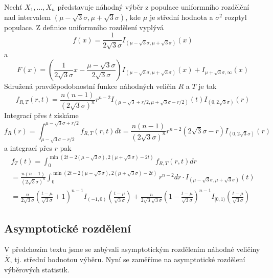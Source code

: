 \begin{example}
Nechť $X_1, ..., X_n$ představuje náhodný výběr z populace uniformního rozdělění nad intervalem $(\mu - \sqrt{3}\sigma, \mu + \sqrt{3}\sigma)$, kde $\mu$ je střední hodnota a $\sigma^2$ rozptyl populace. Z definice uniformního rozdělení vyplývá
\begin{equation*}
f(x) = \frac{1}{2 \sqrt{3} \sigma} I_{(\mu - \sqrt{3}\sigma, \mu + \sqrt{3}\sigma)}(x)
\end{equation*}
a
\begin{equation*}
F(x) = \left(\frac{1}{2 \sqrt{3} \sigma}x - \frac{\mu - \sqrt{3} \sigma}{2 \sqrt{3} \sigma} \right) I_{(\mu - \sqrt{3}\sigma, \mu + \sqrt{3}\sigma)}(x) + I_{\mu + \sqrt{3}\sigma, \infty}(x)
\end{equation*}
Sdružená pravděpodobnostní funkce náhodných veličin $R$ a $T$ je tak
\begin{equation*}
f_{R, T}(r, t) = \frac{n(n - 1)}{(2 \sqrt{3} \sigma)^n} r^{n - 2} I_{(\mu - \sqrt{3} + r/2, \mu + \sqrt{3}\sigma - r/2)}(t)I_{(0, 2 \sqrt{3} \sigma)}(r)
\end{equation*}
Integrací přes $t$ získáme
\begin{equation*}
f_R(r) = \int_{\mu - \sqrt{3} \sigma - r/2}^{\mu - \sqrt{3} \sigma + r/2}f_{R,T}(r,t)dt = \frac{n(n - 1)}{(2 \sqrt{3} \sigma)^n}r^{n - 2}(2 \sqrt{3}\sigma - r)I_{(0, 2 \sqrt{3}\sigma)}(r)
\end{equation*}
a integrací přes $r$ pak
\begin{gather*}
f_T(t) = \int_0^{\min(2t - 2(\mu - \sqrt{3}\sigma), 2(\mu + \sqrt{3}\sigma) - 2t)}f_{R,T}(r,t)dr\\
= \frac{n(n - 1)}{(2 \sqrt{3} \sigma)^n} \int_0^{\min(2t - 2(\mu - \sqrt{3}\sigma), 2(\mu + \sqrt{3}\sigma) - 2t)} r^{n - 2}dr \cdot I_{(\mu - \sqrt{3}\sigma, \mu + \sqrt{3}\sigma)}(t)\\
= \frac{n}{2 \sqrt{3} \sigma} \left(\frac{t - \mu}{\sqrt{3} \sigma} + 1 \right)^{n - 1}I_{(-1, 0)}\left( \frac{t - \mu}{\sqrt{3}\sigma} \right) + \frac{n}{2 \sqrt{3}\sqrt{3}\sigma}\left(1 - \frac{t - \mu}{\sqrt{3}\sigma} \right)^{n - 1}I_{[0, 1)}\left(\frac{t - \mu}{\sqrt{3}\sigma} \right)
\end{gather*}
\end{example}

\subsection{Asymptotické rozdělení}

V předchozím textu jsme se zabývali asymptotickým rozdělením náhodné veličiny $\overline{X}$, tj. střední hodnotou výběru. Nyní se zaměříme na asymptotické rozdělení výběrových statistik.


